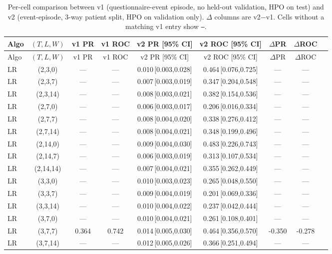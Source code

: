 \begin{longtable}{lcccccccc}
\caption{Per-cell comparison between v1 (questionnaire-event episode, no held-out validation, HPO on test) and v2 (event-episode, 3-way patient split, HPO on validation only).  $\Delta$ columns are v2$-$v1.  Cells without a matching v1 entry show \texttt{---}.}\label{tab:v2_vs_v1}\\
\toprule
Algo & $(T,L,W)$ & v1 PR & v1 ROC & v2 PR [95\% CI] & v2 ROC [95\% CI] & $\Delta$PR & $\Delta$ROC \\
\midrule
\endfirsthead
\toprule
Algo & $(T,L,W)$ & v1 PR & v1 ROC & v2 PR [95\% CI] & v2 ROC [95\% CI] & $\Delta$PR & $\Delta$ROC \\
\midrule
\endhead
\bottomrule
\endfoot
LR & (2,3,0) & --- & --- & 0.010\,[0.003,0.028] & 0.464\,[0.076,0.725] & --- & --- \\
LR & (2,3,7) & --- & --- & 0.007\,[0.003,0.019] & 0.347\,[0.204,0.548] & --- & --- \\
LR & (2,3,14) & --- & --- & 0.008\,[0.003,0.021] & 0.382\,[0.154,0.536] & --- & --- \\
LR & (2,7,0) & --- & --- & 0.006\,[0.003,0.017] & 0.206\,[0.016,0.334] & --- & --- \\
LR & (2,7,7) & --- & --- & 0.008\,[0.004,0.020] & 0.338\,[0.276,0.412] & --- & --- \\
LR & (2,7,14) & --- & --- & 0.008\,[0.004,0.021] & 0.348\,[0.199,0.496] & --- & --- \\
LR & (2,14,0) & --- & --- & 0.009\,[0.004,0.030] & 0.483\,[0.226,0.743] & --- & --- \\
LR & (2,14,7) & --- & --- & 0.006\,[0.003,0.019] & 0.313\,[0.107,0.534] & --- & --- \\
LR & (2,14,14) & --- & --- & 0.007\,[0.004,0.021] & 0.355\,[0.262,0.449] & --- & --- \\
LR & (3,3,0) & --- & --- & 0.010\,[0.003,0.023] & 0.265\,[0.048,0.550] & --- & --- \\
LR & (3,3,7) & --- & --- & 0.009\,[0.004,0.019] & 0.201\,[0.069,0.336] & --- & --- \\
LR & (3,3,14) & --- & --- & 0.010\,[0.004,0.022] & 0.237\,[0.042,0.444] & --- & --- \\
LR & (3,7,0) & --- & --- & 0.010\,[0.004,0.021] & 0.261\,[0.108,0.401] & --- & --- \\
LR & (3,7,7) & 0.364 & 0.742 & 0.014\,[0.005,0.030] & 0.464\,[0.356,0.570] & -0.350 & -0.278 \\
LR & (3,7,14) & --- & --- & 0.012\,[0.005,0.026] & 0.366\,[0.251,0.494] & --- & --- \\

\end{longtable}
